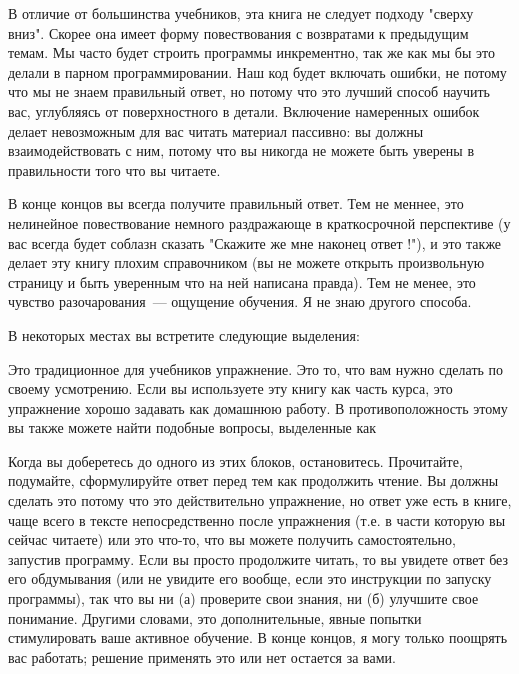 
В отличие от большинства учебников, эта книга не следует подходу "сверху вниз".
Скорее она имеет форму повествования с возвратами к предыдущим темам.
Мы часто будет строить программы инкрементно, так же как мы бы это делали в
парном программировании. Наш код будет включать ошибки, не потому что мы не
знаем правильный ответ, но потому что это лучший способ научить вас, 
углубляясь от поверхностного в детали. Включение намеренных ошибок делает
невозможным для вас читать материал пассивно: вы должны взаимодействовать с
ним, потому что вы никогда не можете быть уверены в правильности того что вы
читаете.

В конце концов вы всегда получите правильный ответ. Тем не меннее, это
нелинейное повествование немного раздражающе в краткосрочной перспективе (у вас
всегда будет соблазн сказать "Скажите же мне наконец ответ !"), и это также
делает эту книгу плохим справочником (вы не можете открыть произвольную
страницу и быть уверенным что на ней написана правда). Тем не менее, это чувство
разочарования\ --- ощущение обучения. Я не знаю другого способа.

\bigskip
В некоторых местах вы встретите следующие выделения:


Это традиционное для учебников упражнение.
Это то, что вам нужно сделать по своему усмотрению.
Если вы используете эту книгу как часть курса, это упражнение хорошо
задавать как домашнюю работу. В противоположность этому вы также можете найти
подобные вопросы, выделенные как 


Когда вы доберетесь до одного из этих блоков, остановитесь. Прочитайте,
подумайте, сформулируйте ответ перед тем как продолжить чтение. Вы должны
сделать это потому что это действительно упражнение, но ответ уже есть в книге,
чаще всего в тексте непосредственно после упражнения (т.е. в части которую вы
сейчас читаете) или это что-то, что вы можете получить самостоятельно,
запустив программу. Если вы просто продолжите читать, то вы увидете ответ без
его обдумывания (или не увидите его вообще, если это инструкции по запуску
программы), так что вы ни (а) проверите свои знания, ни (б) улучшите свое
понимание. Другими словами, это дополнительные, явные попытки стимулировать
ваше активное обучение. В конце концов, я могу только поощрять вас работать;
решение применять это или нет остается за вами.

